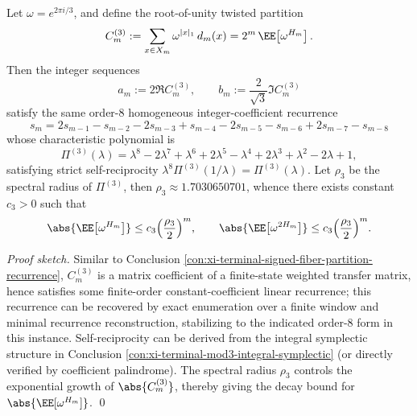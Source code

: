 \begin{conclusion}\label{con:xi-terminal-mod3-fourier-order8-recurrence}
Let \(\omega=e^{2\pi i/3}\), and define the root-of-unity twisted partition
\[
C_m^{(3)}:=\sum_{x\in X_m}\omega^{|x|_1}\,d_m(x)
=2^m\,\EE\!\left[\omega^{H_m}\right].
\]
Then the integer sequences
\[
a_m:=2\Re C_m^{(3)},\qquad b_m:=\frac{2}{\sqrt3}\Im C_m^{(3)}
\]
satisfy the same order-\(8\) homogeneous integer-coefficient recurrence
\[
\boxed{\;
s_m
=2s_{m-1}-s_{m-2}-2s_{m-3}+s_{m-4}-2s_{m-5}-s_{m-6}+2s_{m-7}-s_{m-8}\;}
\]
whose characteristic polynomial is
\[
\Pi^{(3)}(\lambda)=\lambda^8-2\lambda^7+\lambda^6+2\lambda^5-\lambda^4+2\lambda^3+\lambda^2-2\lambda+1,
\]
satisfying strict self-reciprocity \(\lambda^8\Pi^{(3)}(1/\lambda)=\Pi^{(3)}(\lambda)\).
Let \(\rho_3\) be the spectral radius of \(\Pi^{(3)}\), then \(\rho_3\approx 1.7030650701\), whence there exists constant \(c_3>0\) such that
\[
\abs{\EE\!\left[\omega^{H_m}\right]}\le c_3\Bigl(\frac{\rho_3}{2}\Bigr)^m,
\qquad
\abs{\EE\!\left[\omega^{2H_m}\right]}\le c_3\Bigl(\frac{\rho_3}{2}\Bigr)^m.
\]
\end{conclusion}
\begin{proof}[Proof sketch]
Similar to Conclusion \ref{con:xi-terminal-signed-fiber-partition-recurrence},
\(C_m^{(3)}\) is a matrix coefficient of a finite-state weighted transfer matrix, hence satisfies some finite-order constant-coefficient linear recurrence;
this recurrence can be recovered by exact enumeration over a finite window and minimal recurrence reconstruction, stabilizing to the indicated order-\(8\) form in this instance.
Self-reciprocity can be derived from the integral symplectic structure in Conclusion \ref{con:xi-terminal-mod3-integral-symplectic} (or directly verified by coefficient palindrome).
The spectral radius \(\rho_3\) controls the exponential growth of \(\abs{C_m^{(3)}}\), thereby giving the decay bound for \(\abs{\EE[\omega^{H_m}]}\). \qed
\end{proof}

